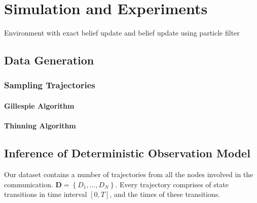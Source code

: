 \chapter{Simulation and Experiments}

Environment with exact belief update and belief update using particle filter

\section{Data Generation}
\subsection{Sampling Trajectories}
\subsubsection{Gillespie Algorithm}
\subsubsection{Thinning Algorithm}
\section{Inference of Deterministic Observation Model}
Our dataset contains a number of trajectories from all the nodes involved in the communication. $ \textbf{D} = \left\lbrace D_{1},..., D_{N}\right\rbrace $. Every trajectory comprises of state transitions in time interval $  [0, T] $, and the times of these transitions.
